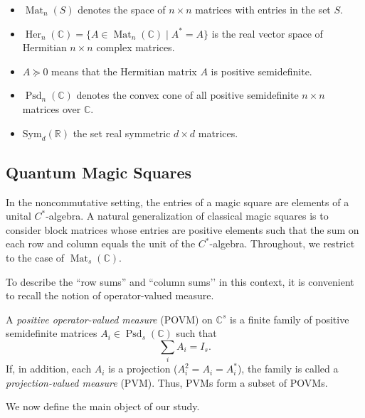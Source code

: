 \documentclass[11pt, a4paper]{article}
\theoremstyle{plain}
\theoremstyle{definition}
\theoremstyle{remark}
\newcommand{\C}{\mathbb{C}}
\newcommand{\Her}[2][\C]{\operatorname{Her}_{#2}(#1)}
\newcommand{\Sym}[1]{\mathrm{Sym}_{#1}(\mathbb{R})}
\begin{document}
\begin{itemize}
    \item \(\operatorname{Mat}_n(S)\) denotes the space of \(n \times n\) matrices with entries in the set \(S\).
    \item \(\Her[\C]{n} = \{ A \in \operatorname{Mat}_n(\C) \mid A^*=A \}\) is the real vector space of Hermitian \(n \times n\) complex matrices.
    \item \(A \succeq 0\) means that the Hermitian matrix \(A\) is positive semidefinite.
    \item \(\operatorname{Psd}_n(\C)\) denotes the convex cone of all positive semidefinite \(n \times n\) matrices over \(\C\).
    \item \(\Sym d\) the set real symmetric \(d \times d\) matrices.
\end{itemize}



\subsection{Quantum Magic Squares} In the noncommutative setting, the entries of a magic square are elements of a unital \(C^*\)-algebra. A natural generalization of classical magic squares is to consider block matrices whose entries are positive elements such that the sum on each row and column equals the unit of the \(C^*\)-algebra. Throughout, we restrict to the case of \(\operatorname{Mat}_s(\C)\). 

To describe the “row sums” and “column sums’’ in this context, it is convenient to recall 
the notion of operator-valued measure.

A \emph{positive operator-valued measure} (POVM) on \(\C^s\) is a finite family of positive 
semidefinite matrices \(A_i \in \operatorname{Psd}_s(\C)\) such that 
\[
\sum_i A_i = I_s.
\]
If, in addition, each \(A_i\) is a projection (\(A_i^2 = A_i = A_i^*\)), the family is called a 
\emph{projection-valued measure} (PVM). Thus, PVMs form a subset of POVMs.


We now define the main object of our study.
\end{document}
